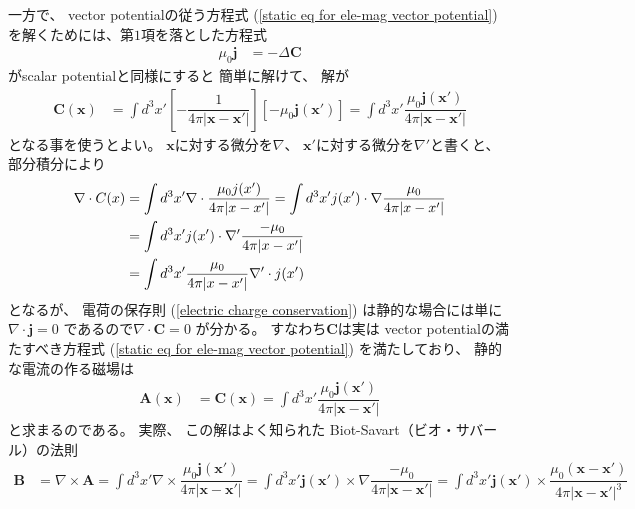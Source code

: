 一方で、
vector potentialの従う方程式
(\ref{static eq for ele-mag vector potential})
を解くためには、第$1$項を落とした方程式
\begin{align}
  \mu_0 \bm{j}
&=
  -
    \Delta
    \bm{C}
\end{align}
がscalar potentialと同様にすると
簡単に解けて、
解が
\begin{align}
  \bm{C} (\bm{x})
&=
  \int d^3 x'
  \left[
    - \dfrac{1}{
      4 \pi |\bm{x} - \bm{x}'|
    }
  \right]
  \left[
    - \mu_0
    \bm{j} (\bm{x}')
  \right]
=
  \int d^3 x'
    \dfrac{
      \mu_0 \bm{j} (\bm{x}')
    }{
      4 \pi
      |\bm{x} - \bm{x}'|
    }
\end{align}
となる事を使うとよい。
$\bm{x}$に対する微分を$\nabla$、
$\bm{x}'$に対する微分を$\nabla'$と書くと、
部分積分により
\begin{align}
  \nabla \cdot C(x)
&=
  \int d^3 x'
    \nabla \cdot
    \dfrac{
      \mu_0 j (x')
    }{
      4 \pi
      |x - x'|
    }
=
  \int d^3 x'
    j (x')
  \cdot
    \nabla
    \dfrac{ \mu_0 }{
      4 \pi
      |x - x'|
    }
\notag\\&
=
  \int d^3 x'
    j (x')
  \cdot
    \nabla'
    \dfrac{ -\mu_0 }{
      4 \pi
      |x - x'|
    }
\notag\\&
=
  \int d^3 x'
    \dfrac{ \mu_0 }{
      4 \pi
      |x - x'|
    }
    \nabla' \cdot j (x')
\end{align}
となるが、
電荷の保存則
(\ref{electric charge conservation})
は静的な場合には単に
$\nabla \cdot \bm{j} = 0$
であるので$\nabla \cdot \bm{C} = 0$
が分かる。
すなわち$\bm{C}$は実は
vector potentialの満たすべき方程式
(\ref{static eq for ele-mag vector potential})
を満たしており、
静的な電流の作る磁場は
\begin{align}
  \bm{A} (\bm{x})
&=
  \bm{C} (\bm{x})
=
  \int d^3 x'
    \dfrac{
      \mu_0 \bm{j} (\bm{x}')
    }{
      4 \pi
      |\bm{x} - \bm{x}'|
    }
\end{align}
と求まるのである。
実際、
この解はよく知られた
Biot-Savart（ビオ・サバール）の法則
\begin{align}
  \bm{B}
&=
  \nabla \times \bm{A}
=
  \int d^3 x'
  \nabla \times
    \dfrac{
      \mu_0 \bm{j} (\bm{x}')
    }{
      4 \pi
      |\bm{x} - \bm{x}'|
    }
=
  \int d^3 x'
  \bm{j} (\bm{x}') \times
  \nabla
    \dfrac{
      - \mu_0
    }{
      4 \pi
      |\bm{x} - \bm{x}'|
    }
=
  \int d^3 x'
  \bm{j} (\bm{x}') \times
    \dfrac{
      \mu_0
      (\bm{x} - \bm{x}')
    }{
      4 \pi
      |\bm{x} - \bm{x}'|^3
    }
\end{align}
